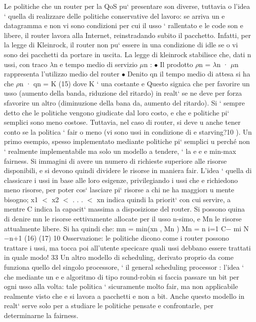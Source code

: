\documentclass[a4paper,12pt]{article}
\begin{document}
Le politiche che un router per la QoS pu` presentare son diverse, tuttavia
o
l'idea ` quella di realizzare delle politiche conservative del lavoro: se arriva un
e
datagramma e non vi sono condizioni per cui il usso ` rallentato e le code son
e
libere, il router lavora alla Internet, reinstradando subito il pacchetto. Infatti,
per la legge di Kleinrock, il router non pu` essere in una condizione di idle se
o
vi sono dei pacchetti da portare in uscita. La legge di kleinrock stabilisce che,
dati n ussi, con traco $\lambda$n e tempo medio di servizio $\mu$n :
$\bullet$ Il prodotto $\rho$n = $\lambda$n · $\mu$n rappresenta l'utilizzo medio del router
$\bullet$ Denito qn il tempo medio di attesa si ha che
$\rho$n · qn = K
(15)
dove K ` una costante
e
Questo signica che per favorire un usso (aumento della banda, riduzione del
ritardo) in realt` se ne deve per forza sfavorire un altro (diminuzione della bana
da, aumento del ritardo).
Si ` sempre detto che le politiche vengono giudicate dal loro costo, e che
e
politiche pi` semplici sono meno costose. Tuttavia, nel caso di router, si deve
u
anche tener conto se la politica ` fair o meno (vi sono ussi in condizione di
e
starving?10 ).
Un primo esempio, spesso implementato mediante politiche pi` semplici
u
perché non ` realmente implementabile ma solo un modello a tendere, ` la
e
e
e
min-max fairness. Si immagini di avere un numero di richieste superiore alle
risorse disponibili, e si devono quindi dividere le risorse in maniera fair. L'idea
` quella di classicare i ussi in base alle loro esigenze, privilegiando i ussi che
e
richiedono meno risorse, per poter cos` lasciare pi` risorse a chi ne ha maggior\i{}
u
mente bisogno; x1 $<$ x2 $<$ . . . $<$ xn indica quindi la priorit` con cui servire,
a
mentre C indica la capacit` massima a disposizione del router. Si possono quina
di denire mn le risorse eettivamente allocate per il usso n-simo, e Mn le
risorse attualmente libere. Si ha quindi che:
mn = min(xn , Mn )
Mn =
n
i=1
C$-$
mi
N $-$n+1
(16)
(17)
10 Osservazione: le politiche dicono come i router possono trattare i ussi, ma tocca poi
all'utente specicare quali ussi debbano essere trattati in quale modo!
33
Un altro modello di scheduling, derivato proprio da come funziona quello del
singolo processore, ` il general scheduling processor : l'idea ` che mediante un
e
e
algoritmo di tipo round-robin si faccia passare un bit per ogni usso alla volta:
tale politica ` sicuramente molto fair, ma non applicabile realmente visto che
e
si lavora a pacchetti e non a bit. Anche questo modello in realt` serve solo per
a
studiare le politiche pensate e confrontarle, per determinarne la fairness.
\end{document}
